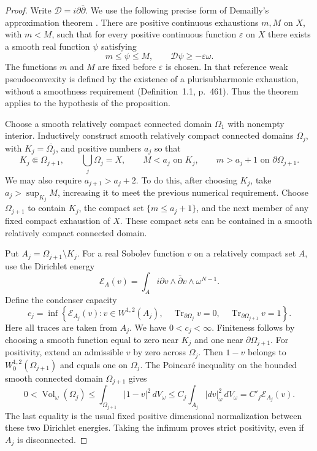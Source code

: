 \documentclass[11pt]{article}
\theoremstyle{remark}
\newcommand{\D}{\mathcal D}
\begin{document}
\begin{proof}
Write $\D=i\partial\bar\partial$. We use the following precise
form of Demailly's approximation theorem
\cite[Theorem~9.4, p.~506]{Demailly82}. There are positive continuous
exhaustions $m,M$ on $X$, with $m<M$, such that for every positive
continuous function $\varepsilon$ on $X$ there exists a smooth
real function $\psi$ satisfying
\begin{equation}\label{eq:arbitrary-error-approximation}
 m\leq\psi\leq M,
 \qquad \D\psi\geq-\varepsilon\omega.
\end{equation}
The functions $m$ and $M$ are fixed before $\varepsilon$ is chosen.
In that reference weak pseudoconvexity is defined by the existence
of a plurisubharmonic exhaustion, without a smoothness requirement
(Definition~1.1, p.~461). Thus the theorem applies to the hypothesis
of the proposition.

Choose a smooth relatively compact connected domain $\Omega_1$
with nonempty interior. Inductively construct smooth relatively
compact connected domains $\Omega_j$, with $K_j=\overline{\Omega_j}$,
and positive numbers $a_j$ so that
\begin{equation}\label{eq:condenser-boundaries}
 K_j\Subset\Omega_{j+1},\qquad
 \bigcup_j\Omega_j=X,\qquad
 M<a_j\text{ on }K_j,\qquad
 m>a_j+1\text{ on }\partial\Omega_{j+1}.
\end{equation}
We may also require $a_{j+1}>a_j+2$. To do this, after choosing
$K_j$, take $a_j>\sup_{K_j}M$, increasing it to meet the previous
numerical requirement. Choose $\Omega_{j+1}$ to contain $K_j$,
the compact set $\{m\leq a_j+1\}$, and the next member of any
fixed compact exhaustion of $X$. These compact sets can be
contained in a smooth relatively compact connected domain.

Put $A_j=\Omega_{j+1}\setminus K_j$. For a real Sobolev function
$v$ on a relatively compact set $A$, use the Dirichlet energy
\[
 \mathcal E_A(v)
 =\int_A i\partial v\wedge\bar\partial v\wedge\omega^{N-1}.
\]
Define the condenser capacity
\[
 c_j=\inf\left\{\mathcal E_{A_j}(v):
 v\in W^{1,2}(A_j),\quad
 \operatorname{Tr}_{\partial\Omega_j}v=0,\quad
 \operatorname{Tr}_{\partial\Omega_{j+1}}v=1\right\}.
\]
Here all traces are taken from $A_j$. We have $0<c_j<\infty$.
Finiteness follows by choosing a smooth function equal to zero
near $K_j$ and one near $\partial\Omega_{j+1}$. For positivity,
extend an admissible $v$ by zero across $\Omega_j$. Then $1-v$
belongs to $W^{1,2}_0(\Omega_{j+1})$ and equals one on $\Omega_j$.
The Poincar\'e inequality on the bounded smooth connected domain
$\Omega_{j+1}$ gives
\[
 0<\operatorname{Vol}_{\omega}(\Omega_j)
 \leq\int_{\Omega_{j+1}}|1-v|^2\,dV_\omega
 \leq C_j\int_{A_j}|dv|_\omega^2\,dV_\omega
 =C'_j\mathcal E_{A_j}(v).
\]
The last equality is the usual fixed positive dimensional
normalization between these two Dirichlet energies. Taking the
infimum proves strict positivity, even if $A_j$ is disconnected.


\end{proof}
\end{document}

